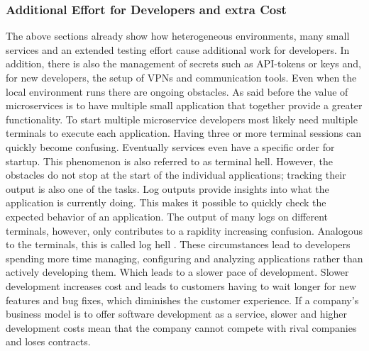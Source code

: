 \documentclass[12pt, a4paper]{article}
\begin{document}
        \subsubsection{Additional Effort for Developers and extra Cost}
        The above sections already show how heterogeneous environments, many small services and an extended testing effort cause additional work for developers. In addition, there is also the management of secrets such as \ac{API}-tokens or keys and, for new developers, the setup of \ac{VPN}s and communication tools. Even when the local environment runs there are ongoing obstacles. As said before the value of microservices is to have multiple small application that together provide a greater functionality. To start multiple microservice developers most likely need multiple terminals to execute each application. Having three or more terminal sessions can quickly become confusing. Eventually services even have a specific order for startup. This phenomenon is also referred to as terminal hell. However, the obstacles do not stop at the start of the individual applications; tracking their output is also one of the tasks. Log outputs provide insights into what the application is currently doing. This makes it possible to quickly check the expected behavior of an application. The output of many logs on different terminals, however, only contributes to a rapidity increasing confusion. Analogous to the terminals, this is called log hell \cite{micro}.\newline
        These circumstances lead to developers spending more time managing, configuring and analyzing applications rather than actively developing them. Which leads to a slower pace of development. Slower development increases cost and leads to customers having to wait longer for new features and bug fixes, which diminishes the customer experience. If a company's business model is to offer software development as a service, slower and higher development costs mean that the company cannot compete with rival companies and loses contracts.
\end{document}

